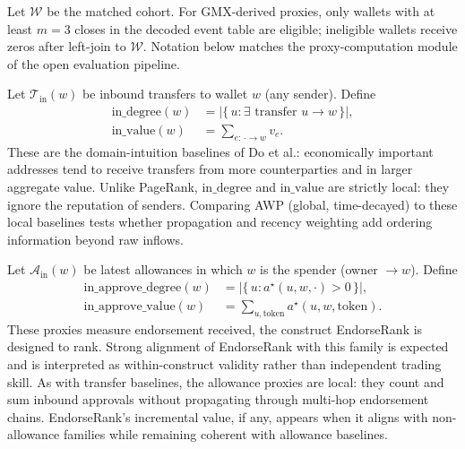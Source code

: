 Let $\mathcal{W}$ be the matched cohort. For GMX-derived proxies, only wallets with at least $m=3$ closes in the decoded event table are eligible; ineligible wallets receive zeros after left-join to $\mathcal{W}$. Notation below matches the proxy-computation module of the open evaluation pipeline.


Let $\mathcal{T}_{\mathrm{in}}(w)$ be inbound transfers to wallet $w$ (any sender). Define
\begin{align}
\mathrm{in\_degree}(w)
&=
\bigl|\{\,u : \exists\text{ transfer }u\to w\,\}\bigr|,
\label{eq:in-degree}\\
\mathrm{in\_value}(w)
&=
\sum_{e:\,\cdot\to w} v_e.
\label{eq:in-value}
\end{align}
These are the domain-intuition baselines of Do et al.: economically important addresses tend to receive transfers from more counterparties and in larger aggregate value. Unlike PageRank, $\mathrm{in\_degree}$ and $\mathrm{in\_value}$ are strictly local: they ignore the reputation of senders. Comparing AWP (global, time-decayed) to these local baselines tests whether propagation and recency weighting add ordering information beyond raw inflows.


Let $\mathcal{A}_{\mathrm{in}}(w)$ be latest allowances in which $w$ is the spender (owner $\to w$). Define
\begin{align}
\mathrm{in\_approve\_degree}(w)
&=
\bigl|\{\,u : a^{\star}(u,w,\cdot)>0\,\}\bigr|,
\label{eq:in-approve-degree}\\
\mathrm{in\_approve\_value}(w)
&=
\sum_{u,\mathrm{token}} a^{\star}(u,w,\mathrm{token}).
\label{eq:in-approve-value}
\end{align}
These proxies measure endorsement received, the construct EndorseRank is designed to rank. Strong alignment of EndorseRank with this family is expected and is interpreted as within-construct validity rather than independent trading skill. As with transfer baselines, the allowance proxies are local: they count and sum inbound approvals without propagating through multi-hop endorsement chains. EndorseRank's incremental value, if any, appears when it aligns with non-allowance families while remaining coherent with allowance baselines.


